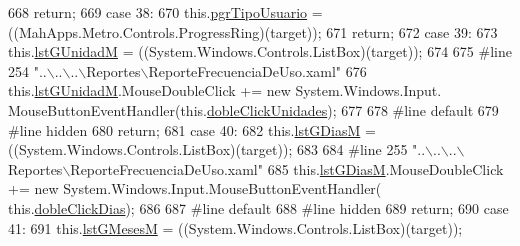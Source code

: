 \begin{DoxyCode}
668             \textcolor{keywordflow}{return};
669             \textcolor{keywordflow}{case} 38:
670             this.\hyperlink{class_proyecto___integrador__3_1_1_reportes_1_1_reporte_frecuencia_de_uso_a6e3380fcd1c9e0e520f2867c8a98d9f0}{pgrTipoUsuario} = ((MahApps.Metro.Controls.ProgressRing)(target));
671             \textcolor{keywordflow}{return};
672             \textcolor{keywordflow}{case} 39:
673             this.\hyperlink{class_proyecto___integrador__3_1_1_reportes_1_1_reporte_frecuencia_de_uso_a809e49373e88f304b1f3d5283d757c61}{lstGUnidadM} = ((System.Windows.Controls.ListBox)(target));
674             
675 \textcolor{preprocessor}{            #line 254 "..\(\backslash\)..\(\backslash\)..\(\backslash\)Reportes\(\backslash\)ReporteFrecuenciaDeUso.xaml"}
676 \textcolor{preprocessor}{}            this.\hyperlink{class_proyecto___integrador__3_1_1_reportes_1_1_reporte_frecuencia_de_uso_a809e49373e88f304b1f3d5283d757c61}{lstGUnidadM}.MouseDoubleClick += \textcolor{keyword}{new} System.Windows.Input.
      MouseButtonEventHandler(this.\hyperlink{class_proyecto___integrador__3_1_1_reportes_1_1_reporte_frecuencia_de_uso_a85f2c2307781a5f965e7785e2ad097c9}{dobleClickUnidades});
677             
678 \textcolor{preprocessor}{            #line default}
679 \textcolor{preprocessor}{}\textcolor{preprocessor}{            #line hidden}
680 \textcolor{preprocessor}{}            \textcolor{keywordflow}{return};
681             \textcolor{keywordflow}{case} 40:
682             this.\hyperlink{class_proyecto___integrador__3_1_1_reportes_1_1_reporte_frecuencia_de_uso_a53386efc7578719e8fa049b5b2540f66}{lstGDiasM} = ((System.Windows.Controls.ListBox)(target));
683             
684 \textcolor{preprocessor}{            #line 255 "..\(\backslash\)..\(\backslash\)..\(\backslash\)Reportes\(\backslash\)ReporteFrecuenciaDeUso.xaml"}
685 \textcolor{preprocessor}{}            this.\hyperlink{class_proyecto___integrador__3_1_1_reportes_1_1_reporte_frecuencia_de_uso_a53386efc7578719e8fa049b5b2540f66}{lstGDiasM}.MouseDoubleClick += \textcolor{keyword}{new} System.Windows.Input.MouseButtonEventHandler(
      this.\hyperlink{class_proyecto___integrador__3_1_1_reportes_1_1_reporte_frecuencia_de_uso_a2ab966196c9bc681df237775e5084d8d}{dobleClickDias});
686             
687 \textcolor{preprocessor}{            #line default}
688 \textcolor{preprocessor}{}\textcolor{preprocessor}{            #line hidden}
689 \textcolor{preprocessor}{}            \textcolor{keywordflow}{return};
690             \textcolor{keywordflow}{case} 41:
691             this.\hyperlink{class_proyecto___integrador__3_1_1_reportes_1_1_reporte_frecuencia_de_uso_a8c5a6768727a54835e71fce7e83a1392}{lstGMesesM} = ((System.Windows.Controls.ListBox)(target));

\end{DoxyCode}
